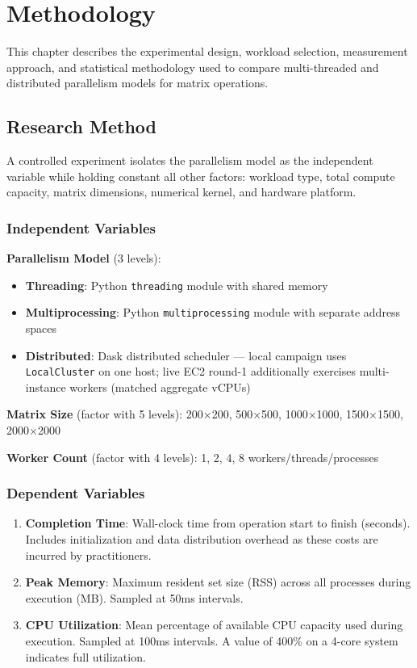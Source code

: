 \chapter{Methodology}

This chapter describes the experimental design, workload selection, measurement approach, and statistical methodology used to compare multi-threaded and distributed parallelism models for matrix operations.

\section{Research Method}

A controlled experiment isolates the parallelism model as the independent variable while holding constant all other factors: workload type, total compute capacity, matrix dimensions, numerical kernel, and hardware platform.

\subsection{Independent Variables}

\textbf{Parallelism Model} (3 levels):
\begin{itemize}
    \item \textbf{Threading}: Python \texttt{threading} module with shared memory
    \item \textbf{Multiprocessing}: Python \texttt{multiprocessing} module with separate address spaces
    \item \textbf{Distributed}: Dask distributed scheduler — local campaign uses \texttt{LocalCluster} on one host; live EC2 round-1 additionally exercises multi-instance workers (matched aggregate vCPUs)
\end{itemize}

\textbf{Matrix Size} (factor with 5 levels): 200×200, 500×500, 1000×1000, 1500×1500, 2000×2000

\textbf{Worker Count} (factor with 4 levels): 1, 2, 4, 8 workers/threads/processes

\subsection{Dependent Variables}

\begin{enumerate}
    \item \textbf{Completion Time}: Wall-clock time from operation start to finish (seconds). Includes initialization and data distribution overhead as these costs are incurred by practitioners.
    
    \item \textbf{Peak Memory}: Maximum resident set size (RSS) across all processes during execution (MB). Sampled at 50ms intervals.
    
    \item \textbf{CPU Utilization}: Mean percentage of available CPU capacity used during execution. Sampled at 100ms intervals. A value of 400\% on a 4-core system indicates full utilization.
\end{enumerate}

